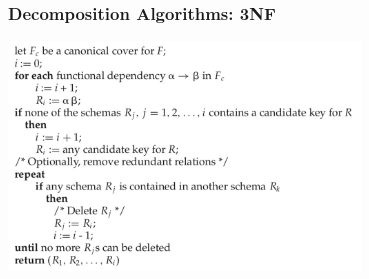 \begin{frame}
\frametitle{Decomposition Algorithms: 3NF}


\begin{center}
\includegraphics[width=0.7\textwidth]{images/3nf-algorithm}
\end{center}



\end{frame}





